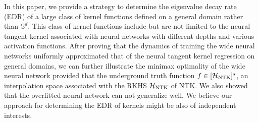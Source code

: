 
In this paper,
we provide a strategy to determine the eigenvalue decay rate (EDR) of a large class of kernel functions defined on a general domain rather than $\mathbb S^{d}$.
This class of kernel functions include but are not limited to the neural tangent kernel associated with neural networks with different depths and various activation functions.
After proving that the dynamics of training the wide neural networks uniformly approximated that of the neural tangent kernel regression on general domains,
we  can further illustrate  the minimax optimality of the wide neural network provided that the underground truth function
$f\in [\mathcal H_{\mathrm{NTK}}]^{s}$, an interpolation space associated with the RKHS $\mathcal{H}_{\mathrm{NTK}}$ of NTK\@.
We also showed that the overfitted neural network can not generalize well.
We believe our approach for determining the EDR of kernels might be also of independent interests. 








%
